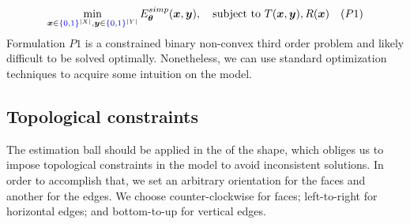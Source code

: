 \begin{align*}
	\min_{\bm{x} \in {\color{blue}{\{0,1\}}}^{|X|}, \bm{y} \in {\color{blue}{\{0,1\}}}^{|Y|}}{E_{\bm{\theta}}^{simp}(\bm{x},\bm{y})}, \quad \text{subject to } T(\bm{x},\bm{y}), R(\bm{x}) \quad (P1)
\end{align*}
%
	Formulation $P1$ is a constrained binary non-convex third order problem and likely difficult to be solved optimally. Nonetheless, we can use standard optimization techniques to acquire some intuition on the model. 	
	
\subsection{Topological constraints}
\label{ch5:subsec:topological-constraints}

The estimation ball should be applied in the  of the shape, which obliges us to impose topological constraints in the model to avoid inconsistent solutions. In order to accomplish that, we set an arbitrary orientation for the faces and another for the edges. We choose counter-clockwise for faces; left-to-right for horizontal edges; and bottom-to-up for vertical edges. 


